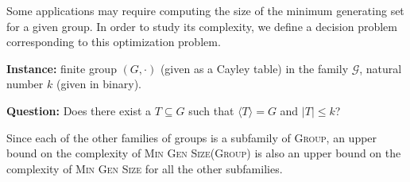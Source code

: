 \documentclass{article}
\newcommand{\gen}[1]{{\langle #1 \rangle}}
\begin{document}
Some applications may require computing the size of the minimum generating set for a given group.
In order to study its complexity, we define a decision problem corresponding to this optimization problem.

\begin{definition}
  \mbox{}

  \textbf{Instance:} finite group $(G, \cdot)$ (given as a Cayley table) in the family $\mathcal{G}$, natural number $k$ (given in binary).

  \textbf{Question:} Does there exist a $T \subseteq G$ such that $\gen{T} = G$ and $|T| \leq k$?
\end{definition}

Since each of the other families of groups is a subfamily of \textsc{Group}, an upper bound on the complexity of \textsc{Min Gen Size(Group)} is also an upper bound on the complexity of \textsc{Min Gen Size} for all the other subfamilies.





\end{document}
